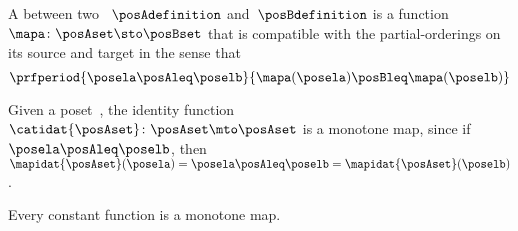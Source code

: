 \begin{definition}
    \label{def:monotone}
    A  between two ~$\posAdefinition$ and~$\posBdefinition$ is a function~$\mapa \colon \posAset \sto \posBset$ that is compatible with the partial-orderings on its source and target in the sense that
    \begin{equation}\label{eq:monotone-map-definition}
        \prfperiod{
            \posela \posAleq \poselb
        }{
            \mapa(\posela) \posBleq \mapa(\poselb)
        }
    \end{equation}
\end{definition}
\showslides{
    \begin{forslides}
        \begin{equation}\label{eq:monotone-map-identity}
            \prfperiod{
                \posela \posAleq \poselb
            }{
                \posela \posAleq \poselb
            }
        \end{equation}
        \begin{equation}\label{eq:monotone-map-discrete-1}
            \prfdoubleperiod{
                \posela \posAleq \poselb
            }{
                \posela = \poselb
            }
        \end{equation}
        \begin{equation}\label{eq:monotone-map-discrete-2}
            \prfperiod{
                \posela \posAleq \posela
            }{
                \mora(\posela) \posAleq \mora(\posela)
            }
        \end{equation}
        \begin{equation}\label{eq:monotone-map-constant}
            \prfperiod{
                \posela \posAleq \poselb
            }{
                \poselc \posAleq \poselc
            }
        \end{equation}
    \end{forslides}
}

\begin{example}
    Given a poset~\posA, the identity function $\catidat{\posAset}\colon \posAset \mto\linebreak[0] \posAset$ is a monotone map, since if~$\posela\posAleq \poselb$, then~$\mapidat{\posAset}(\posela)=\posela \posAleq \poselb = \mapidat{\posAset}(\poselb )$.
\end{example}

\begin{example}
    Every constant function is a monotone map.
\end{example}

